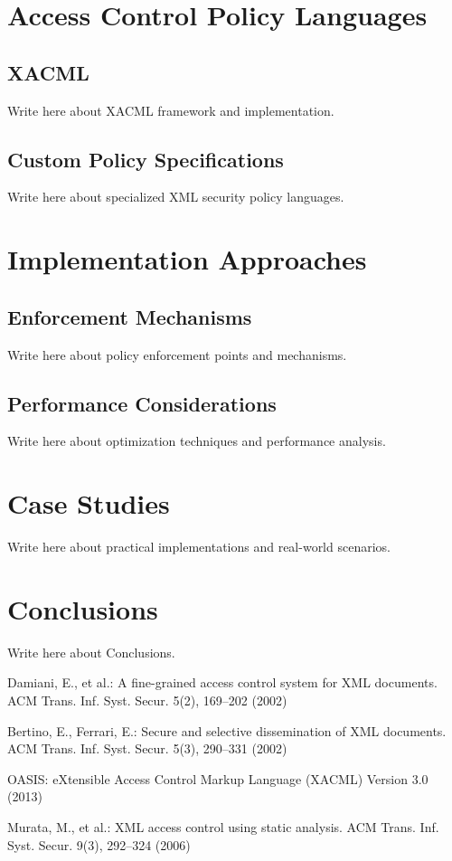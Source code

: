 \documentclass[runningheads]{llncs}
\begin{document}
\section{Access Control Policy Languages}

\subsection{XACML}
Write here about XACML framework and implementation.

\subsection{Custom Policy Specifications}
Write here about specialized XML security policy languages.

\section{Implementation Approaches}

\subsection{Enforcement Mechanisms}
Write here about policy enforcement points and mechanisms.

\subsection{Performance Considerations}
Write here about optimization techniques and performance analysis.

\section{Case Studies}
Write here about practical implementations and real-world scenarios.

\section{Conclusions}
Write here about Conclusions.

\begin{thebibliography}{8}
Damiani, E., et al.: A fine-grained access control system for XML documents. ACM Trans. Inf. Syst. Secur. 5(2), 169--202 (2002)

Bertino, E., Ferrari, E.: Secure and selective dissemination of XML documents. ACM Trans. Inf. Syst. Secur. 5(3), 290--331 (2002)

OASIS: eXtensible Access Control Markup Language (XACML) Version 3.0 (2013)

Murata, M., et al.: XML access control using static analysis. ACM Trans. Inf. Syst. Secur. 9(3), 292--324 (2006)

\end{thebibliography}
\end{document}
